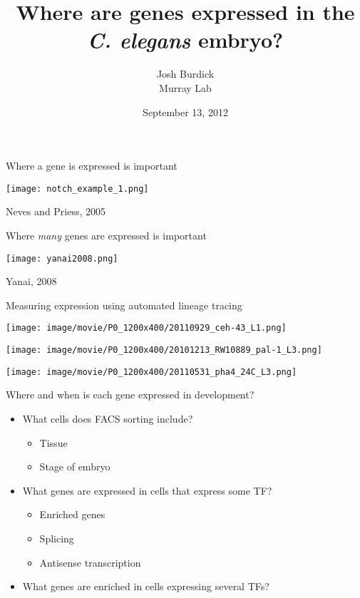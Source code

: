 \documentclass[serif,9pt]{beamer}
\title{Where are genes expressed in the {\em C. elegans} embryo?}
\author{Josh Burdick \\ Murray Lab}
\date{September 13, 2012}
\begin{document}
\begin{frame}
\titlepage
\end{frame}

\begin{frame}{Where a gene is expressed is important}

\begin{centering}
\texttt{[image: notch\_example\_1.png]}
\end{centering}

\hfill Neves and Priess, 2005

\end{frame}

\begin{frame}{Where {\em many} genes are expressed is important}

\texttt{[image: yanai2008.png]}

\hfill Yanai, 2008

\end{frame}

\begin{frame}{Measuring expression using automated lineage tracing}

{\center
\texttt{[image: image/movie/P0\_1200x400/20110929\_ceh-43\_L1.png]}

\texttt{[image: image/movie/P0\_1200x400/20101213\_RW10889\_pal-1\_L3.png]}

\texttt{[image: image/movie/P0\_1200x400/20110531\_pha4\_24C\_L3.png]}

}

\end{frame}

\begin{frame}{Where and when is each gene expressed in development?}

\begin{itemize}
\item What cells does FACS sorting include?
\begin{itemize}
\item Tissue
\item Stage of embryo
\end{itemize}

\item What genes are expressed in cells that express some TF?
\begin{itemize}
\item Enriched genes
\item Splicing
\item Antisense transcription
\end{itemize}

\item What genes are enriched in cells expressing several TFs?

\end{itemize}

\end{frame}
\end{document}
